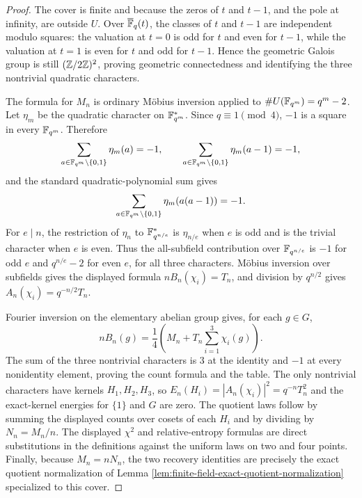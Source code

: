 \begin{proof}
The cover is finite and \etale{} because the zeros of \(t\) and \(t-1\), and the
pole at infinity, are outside \(U\).  Over \(\overline{\mathbb{F}}_q(t)\), the classes
of \(t\) and \(t-1\) are independent modulo squares: the valuation at \(t=0\)
is odd for \(t\) and even for \(t-1\), while the valuation at \(t=1\) is even
for \(t\) and odd for \(t-1\).  Hence the geometric Galois group is still
\((\mathbb{Z}/2\mathbb{Z})^2\), proving geometric connectedness and identifying the three
nontrivial quadratic characters.

The formula for \(M_n\) is ordinary M\"obius inversion applied to
\(\#U(\mathbb{F}_{q^m})=q^m-2\).  Let \(\eta_m\) be the quadratic character on
\(\mathbb{F}_{q^m}^{\ast}\).  Since \(q\equiv1\pmod4\), \(-1\) is a square in every
\(\mathbb{F}_{q^m}\).  Therefore
\[
\sum_{a\in \mathbb{F}_{q^m}\setminus\{0,1\}}\eta_m(a)=-1,
\qquad
\sum_{a\in \mathbb{F}_{q^m}\setminus\{0,1\}}\eta_m(a-1)=-1,
\]
and the standard quadratic-polynomial sum gives
\[
\sum_{a\in \mathbb{F}_{q^m}\setminus\{0,1\}}\eta_m(a(a-1))=-1.
\]
For \(e\mid n\), the restriction of \(\eta_n\) to
\(\mathbb{F}_{q^{n/e}}^{\ast}\) is \(\eta_{n/e}\) when \(e\) is odd and is the trivial
character when \(e\) is even.  Thus the all-subfield contribution over
\(\mathbb{F}_{q^{n/e}}\) is \(-1\) for odd \(e\) and \(q^{n/e}-2\) for even \(e\), for
all three characters.  M\"obius inversion over subfields gives the displayed
formula \(nB_n(\chi_i)=T_n\), and division by \(q^{n/2}\) gives
\(A_n(\chi_i)=q^{-n/2}T_n\).

Fourier inversion on the elementary abelian group gives, for each \(g\in G\),
\[
nB_n(g)=\frac14\left(M_n+T_n\sum_{i=1}^3\chi_i(g)\right).
\]
The sum of the three nontrivial characters is \(3\) at the identity and \(-1\)
at every nonidentity element, proving the count formula and the table.  The
only nontrivial characters have kernels \(H_1,H_2,H_3\), so
\(E_n(H_i)=|A_n(\chi_i)|^2=q^{-n}T_n^2\) and the exact-kernel energies for
\(\{1\}\) and \(G\) are zero.  The quotient laws follow by summing the displayed
counts over cosets of each \(H_i\) and by dividing by \(N_n=M_n/n\).  The
displayed \(\chi^2\) and relative-entropy formulas are direct substitutions in
the definitions against the uniform laws on two and four points.  Finally,
because \(M_n=nN_n\), the two recovery identities are precisely the exact
quotient normalization of Lemma \ref{lem:finite-field-exact-quotient-normalization}
specialized to this cover.
\end{proof}

\endinput

